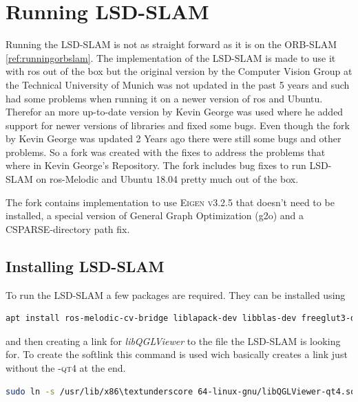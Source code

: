 \section{Running LSD-SLAM}
Running the LSD-SLAM is not as straight forward as it is on the ORB-SLAM \ref{ref:runningorbslam}. The implementation of the LSD-SLAM is made to use it with \gls{ros} out of the box but the original version by the Computer Vision Group at the Technical University of Munich was not updated in the past 5 years and such had some problems when running it on a newer version of \gls{ros} and Ubuntu. Therefor an more up-to-date version by Kevin George \cite{kevingeorgelsdslam} was used where he added support for newer versions of libraries and fixed some bugs. Even though the fork by Kevin George was updated 2 Years ago there were still some bugs and other problems. So a fork was created with the fixes to address the problems that where in Kevin George's Repository. The fork includes bug fixes to run LSD-SLAM on \gls{ros}-Melodic and Ubuntu 18.04 pretty much out of the box.\newline

The fork\cite{alexandervoglspergerlsdslam} contains implementation to use \textsc{Eigen v3.2.5} that doesn't need to be installed, a special version of General Graph Optimization (\gls{g2o}) and a \textsc{CSPARSE}-directory path fix.\newline

\subsection{Installing LSD-SLAM}
To run the LSD-SLAM a few packages are required. They can be installed using\newline
\begin{lstlisting}[language=bash]
    apt install ros-melodic-cv-bridge liblapack-dev libblas-dev freeglut3-dev libqglviewer-dev-qt4 libsuitesparse-dev libx11-dev
\end{lstlisting}

and then creating a link for \textit{libQGLViewer} to the file the LSD-SLAM is looking for. To create the softlink this command is used wich basically creates a link just without the \textsc{-qt4} at the end.\newline
\begin{lstlisting}[language=bash]
    sudo ln -s /usr/lib/x86\textunderscore 64-linux-gnu/libQGLViewer-qt4.so /usr/lib/x86\textunderscore 64-linux-gnu/libQGLViewer.so
\end{lstlisting}

